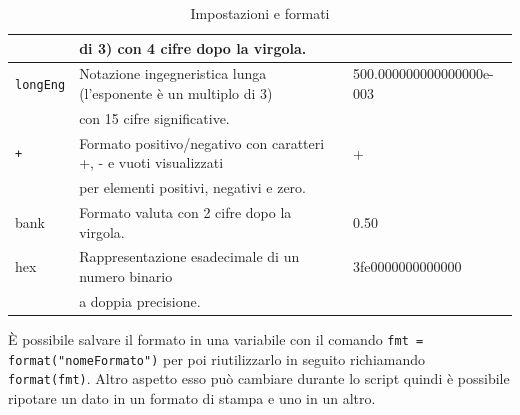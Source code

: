 \begin{table}[ht]
\begin{tabular}{lll}
               &di 3) con 4 cifre dopo la virgola.\\\hline
    \lstinline|longEng| & Notazione ingegneristica lunga (l'esponente è un multiplo di 3) & 500.000000000000000e-003\\ & con 15 cifre significative.\\\hline
    \lstinline|+|&Formato positivo/negativo con caratteri +, - e vuoti visualizzati & +\\
               & per elementi positivi, negativi e zero.\\\hline
    bank & Formato valuta con 2 cifre dopo la virgola. & 0.50 \\\hline
    hex & Rappresentazione esadecimale di un numero binario & 3fe0000000000000 \\
               & a doppia precisione.\\\hline 
  \end{tabular}
  \caption{Impostazioni e formati}
  \label{tab:form}
\end{table}
\begin{notab}
  È possibile salvare il formato in una variabile con il comando \lstinline|fmt = format("nomeFormato")|
  per poi riutilizzarlo in seguito richiamando \lstinline|format(fmt)|. Altro aspetto esso può cambiare durante lo script quindi è possibile ripotare un dato
  in un formato di stampa e uno in un altro.
\end{notab}
